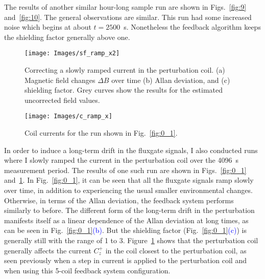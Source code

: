 The results of another similar hour-long sample run are shown in
Figs.~\ref{fig:9} and~\ref{fig:10}.  The general observations are
similar.  This run had some increased noise which begins at about
$t=2500$~s.  Nonetheless the feedback algorithm keeps the shielding
factor generally above one.

\begin{figure}
\centering
\texttt{[image: Images/sf\_ramp\_x2]}
\caption[Correcting a slowly ramped current in the perturbation coil.]{Correcting a slowly ramped current in the perturbation coil.  (a)
 Magnetic field changes $\Delta B$ over time (b) Allan deviation, and
 (c) shielding factor.  Grey curves show the results for the estimated
 uncorrected field values.}  \label{fig:0_1}
        \texttt{[image: Images/c\_ramp\_x]}
        \caption{Coil currents for the run shown in Fig.~\ref{fig:0_1}.}
        \label{fig:0_2}
\end{figure}

In order to induce a long-term drift in the fluxgate signals, I also
conducted runs where I slowly ramped the current in the perturbation
coil over the 4096~s measurement period.  The results of one such run
are shown in Figs.~\ref{fig:0_1} and~\ref{fig:0_2}.  In
Fig.~\ref{fig:0_1}, it can be seen that all the fluxgate signals ramp
slowly over time, in addition to experiencing the usual smaller
environmental changes.  Otherwise, in terms of the Allan deviation,
the feedback system performs similarly to before.  The different form
of the long-term drift in the perturbation manifests itself as a
linear dependence of the Allan deviation at long times, as can be seen
in Fig.~\ref{fig:0_1}\textcolor{blue}{(b)}.  But the shielding factor
(Fig.~\ref{fig:0_1}\textcolor{blue}{(c)}) is generally still with the range of 1 to 3.
Figure~\ref{fig:0_2} shows that the perturbation coil generally
affects the current $C_z^+$ in the coil closest to the perturbation
coil, as seen previously when a step in current is applied to the
perturbation coil and when using this 5-coil feedback system
configuration.

